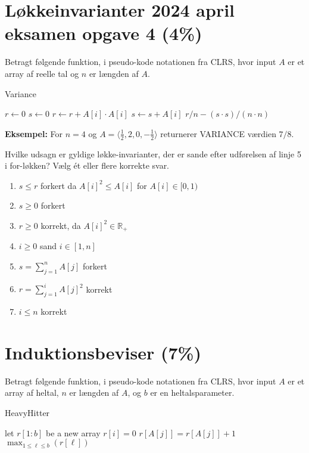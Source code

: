 \documentclass{article}
\theoremstyle{definition}
\begin{document}
\section{Løkkeinvarianter 2024 april eksamen opgave 4 (4\%)}

Betragt følgende funktion, i pseudo-kode notationen fra CLRS, hvor input $A$ er et array af reelle tal og $n$ er længden af $A$.

\begin{algorithm}
\caption{Variance}
\begin{algorithmic}[1]
\State $r \leftarrow 0$
\State $s \leftarrow 0$
    \State $r \leftarrow r + A[i] \cdot A[i]$
    \State $s \leftarrow s + A[i]$
\EndFor
\State \Return $r/n - (s \cdot s)/(n \cdot n)$
\end{algorithmic}
\end{algorithm}

\textbf{Eksempel:} For $n = 4$ og $A = \langle \frac{1}{2}, 2, 0, -\frac{1}{2} \rangle$ returnerer VARIANCE værdien $7/8$.

Hvilke udsagn er gyldige løkke-invarianter, der er sande efter udførelsen af linje 5 i for-løkken? Vælg ét eller flere korrekte svar.

\begin{enumerate}
    \item $s \leq r$ forkert da $A[i]^2 \leq A[i]$ for $A[i] \in [0,1)$ 
    \item $s \geq 0$ forkert
    \item $r \geq 0$ korrekt, da $A[i]^2 \in \mathbb{R}_{+}$ 
    \item $i \geq 0$ sand $i \in [1, n]$
    \item $s = \sum_{j=1}^n A[j]$ forkert 
    \item $r = \sum_{j=1}^i A[j]^2$ korrekt
    \item $i \leq n$ korrekt 
\end{enumerate}


\section{Induktionsbeviser (7\%)}
Betragt følgende funktion, i pseudo-kode notationen fra CLRS, hvor input $A$ er et array af heltal, $n$ er længden af $A$, og $b$ er en heltalsparameter.

\begin{algorithm}
\caption{HeavyHitter}
\begin{algorithmic}[1]
\State let $r[1:b]$ be a new array
    \State $r[i] = 0$
\EndFor
{}
        \State $r[A[j]] = r[A[j]] + 1$
    \EndIf
\EndFor
\State \Return $\max_{1 \leq \ell \leq b}(r[\ell])$
\end{algorithmic}
\end{algorithm}
\end{document}
